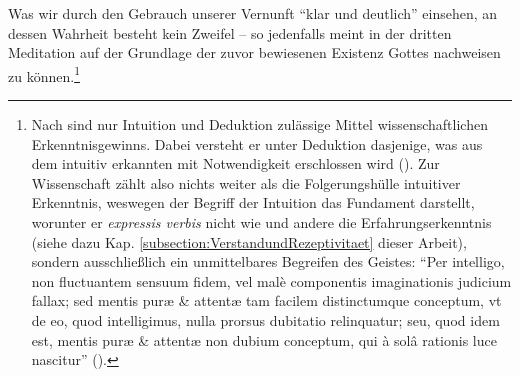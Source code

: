 Was wir durch den Gebrauch unserer Vernunft \enquote{klar und deutlich}
einsehen, an dessen Wahrheit besteht kein Zweifel -- so
jedenfalls meint  in der dritten
Meditation auf der Grundlage der zuvor bewiesenen Existenz Gottes nachweisen zu
können.\footnote{Nach  sind nur
Intuition und Deduktion zulässige Mittel wissenschaftlichen Erkenntnisgewinns.
Dabei versteht er unter Deduktion dasjenige, was aus dem intuitiv erkannten mit
Notwendigkeit erschlossen wird \mkbibparens{\cite[vgl.][X:
369.18--22]{Descartes:OeuvresdeDescartes1983}}.
Zur Wissenschaft zählt also nichts weiter als die Folgerungshülle intuitiver
Erkenntnis, weswegen der Begriff der Intuition das Fundament darstellt, worunter
er \emph{expressis verbis} nicht wie
 und andere
die Erfahrungserkenntnis (siehe dazu Kap.
\ref{subsection:VerstandundRezeptivitaet} dieser Arbeit), sondern ausschließlich
ein unmittelbares Begreifen des Geistes:
\enquote{Per  intelligo, non fluctuantem sensuum fidem, vel mal{\`e} componentis imaginationis judicium fallax; sed
  mentis pur{\ae} {\&} attent{\ae} tam facilem distinctumque conceptum, vt de
  eo, quod intelligimus, nulla prorsus dubitatio relinquatur; seu, quod idem est, mentis
  pur{\ae} {\&} attent{\ae} non dubium conceptum, qui {\`a} sol{\^a} rationis
  luce nascitur} \mkbibparens{\cite[][X:
  368.13--19]{Descartes:OeuvresdeDescartes1983}}.} 

